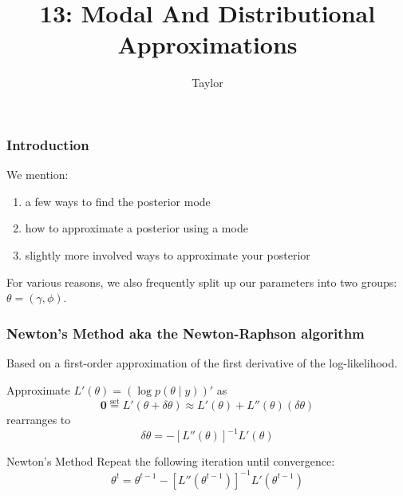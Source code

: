\documentclass{beamer}
\title["13"]{13: Modal And Distributional Approximations}
\author{Taylor}
\institute[UVA] 
{
University of Virginia \\
\medskip
\textit{} 
}
\date{}
\begin{document}

\begin{frame}
\titlepage 
\end{frame}

\begin{frame}
\frametitle{Introduction}

We mention:
\begin{enumerate}
\item a few ways to find the posterior mode
\item how to approximate a posterior using a mode 
\item slightly more involved ways to approximate your posterior
\end{enumerate}

For various reasons, we also frequently split up our parameters into two groups: $\theta = (\gamma, \phi)$.


\end{frame}

\begin{frame}
\frametitle{Newton's Method aka the Newton-Raphson algorithm}

Based on a first-order approximation of the first derivative of the log-likelihood.
\newline

Approximate $L'(\theta) = (\log p(\theta \mid y))'$ as
$$
\mathbf{0} \overset{\text{set}}{=}  L'(\theta + \delta \theta) \approx L'(\theta ) + L''(\theta)(\delta \theta) 
$$
rearranges to 
$$
\delta \theta  =  - [L''(\theta)]^{-1} L'(\theta ) 
$$

\begin{block}{Newton's Method}
Repeat the following iteration until convergence:
\[
\theta^{t} = \theta^{t-1} - [L''(\theta^{t-1})]^{-1} L'(\theta^{t-1} ) 
\]
\end{block}

\end{frame}
\end{document}
